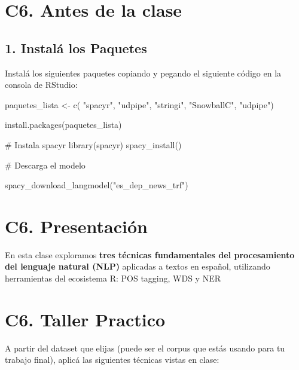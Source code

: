 \documentclass[
  letterpaper,
  DIV=11,
  numbers=noendperiod]{scrreprt}
\newenvironment{Shaded}{\begin{snugshade}}{\end{snugshade}}
\newcommand{\CommentTok}[1]{\textcolor[rgb]{0.37,0.37,0.37}{#1}}
\newcommand{\FunctionTok}[1]{\textcolor[rgb]{0.28,0.35,0.67}{#1}}
\newcommand{\NormalTok}[1]{\textcolor[rgb]{0.00,0.23,0.31}{#1}}
\newcommand{\OtherTok}[1]{\textcolor[rgb]{0.00,0.23,0.31}{#1}}
\newcommand{\StringTok}[1]{\textcolor[rgb]{0.13,0.47,0.30}{#1}}
\begin{document}
\chapter{C6. Antes de la clase}\label{c6.-antes-de-la-clase}

\section{\texorpdfstring{\textbf{1. Instalá los
Paquetes}}{1. Instalá los Paquetes}}\label{instaluxe1-los-paquetes-2}

Instalá los siguientes paquetes copiando y pegando el siguiente código
en la consola de RStudio:

\begin{Shaded}
\begin{Highlighting}[]

\NormalTok{paquetes\_lista }\OtherTok{\textless{}{-}} \FunctionTok{c}\NormalTok{(}
  \StringTok{"spacyr"}\NormalTok{, }\StringTok{"udpipe"}\NormalTok{, }\StringTok{"stringi"}\NormalTok{, }\StringTok{"SnowballC"}\NormalTok{, }\StringTok{"udpipe"}\NormalTok{)}

\FunctionTok{install.packages}\NormalTok{(paquetes\_lista)}

\CommentTok{\# Instala spacyr}
\FunctionTok{library}\NormalTok{(spacyr)}
\FunctionTok{spacy\_install}\NormalTok{()}

\CommentTok{\# Descarga el modelo}

\FunctionTok{spacy\_download\_langmodel}\NormalTok{(}\StringTok{"es\_dep\_news\_trf"}\NormalTok{)}
\end{Highlighting}
\end{Shaded}

\chapter{C6. Presentación}\label{c6.-presentaciuxf3n}

En esta clase exploramos \textbf{tres técnicas fundamentales del
procesamiento del lenguaje natural (NLP)} aplicadas a textos en español,
utilizando herramientas del ecosistema R: POS tagging, WDS y NER

\chapter{C6. Taller Practico}\label{c6.-taller-practico}

A partir del dataset que elijas (puede ser el corpus que estás usando
para tu trabajo final), aplicá las siguientes técnicas vistas en clase:
\end{document}
